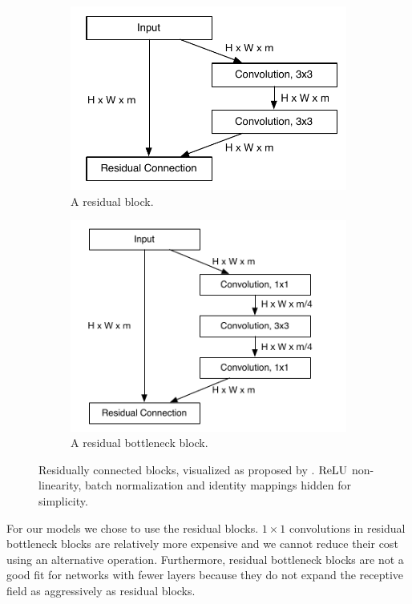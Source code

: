 \begin{figure}[h!]
  \begin{center}
  \begin{subfigure}{.5\textwidth}
    \begin{center}
        \includegraphics[width=.9\linewidth]{images/residual_block.pdf}
        \caption{A residual block.}
        \label{fig:residual_block}
      \end{center}
  \end{subfigure}%
    \begin{subfigure}{.5\textwidth}
      \begin{center}
        \includegraphics[width=.9\linewidth]{images/residual_bottleneck.pdf}
        \caption{A residual bottleneck block. }
        \label{fig:residual_bottleneck_block}
          \end{center}
  \end{subfigure}
  \end{center}
  \caption{Residually connected blocks, visualized as proposed by \cite{He:2015aa}. $\textrm{ReLU}$ non-linearity, batch normalization and identity mappings hidden for simplicity.}
  \label{fig:residual_blocks}
\end{figure}
For our models we chose to use the residual blocks. $1 \times 1$ convolutions in residual bottleneck blocks are relatively more expensive and we cannot reduce their cost using an alternative operation. Furthermore, residual bottleneck blocks are not a good fit for networks with fewer layers because they do not expand the receptive field as aggressively as residual blocks.

